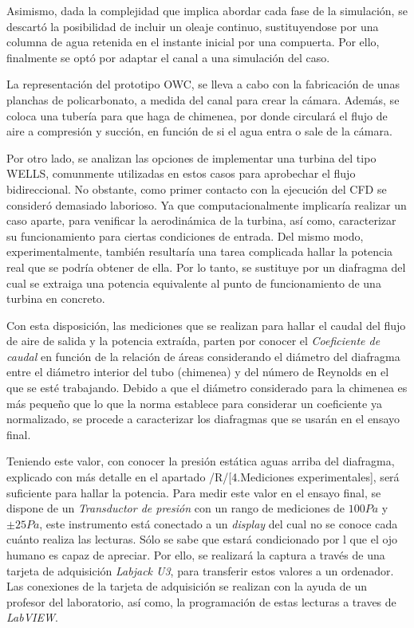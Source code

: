 Asimismo, dada la complejidad que implica abordar cada fase de la
simulación, se descartó la posibilidad de incluir un oleaje continuo,
sustituyendose por una columna de agua retenida en el instante inicial
por una compuerta. Por ello, finalmente se optó por adaptar el canal a
una simulación del caso.

La representación del prototipo OWC, se lleva a cabo con la fabricación
de unas planchas de policarbonato, a medida del canal para crear la
cámara. Además, se coloca una tubería para que haga de chimenea, por
donde circulará el flujo de aire a compresión y succión, en función de
si el agua entra o sale de la cámara.

Por otro lado, se analizan las opciones de implementar una turbina del
tipo WELLS, comunmente utilizadas en estos casos para aprobechar el
flujo bidireccional. No obstante, como primer contacto con la ejecución
del CFD se consideró demasiado laborioso. Ya que computacionalmente
implicaría realizar un caso aparte, para venificar la aerodinámica de la
turbina, así como, caracterizar su funcionamiento para ciertas
condiciones de entrada. Del mismo modo, experimentalmente, también
resultaría una tarea complicada hallar la potencia real que se podría
obtener de ella. Por lo tanto, se sustituye por un diafragma del cual se
extraiga una potencia equivalente al punto de funcionamiento de una
turbina en concreto.

Con esta disposición, las mediciones que se realizan para hallar el
caudal del flujo de aire de salida y la potencia extraída, parten por
conocer el \emph{Coeficiente de caudal} en función de la relación de
áreas considerando el diámetro del diafragma entre el diámetro interior
del tubo (chimenea) y del número de Reynolds en el que se esté
trabajando. Debido a que el diámetro considerado para la chimenea es más
pequeño que lo que la norma establece para considerar un coeficiente ya
normalizado, se procede a caracterizar los diafragmas que se usarán en
el ensayo final.

Teniendo este valor, con conocer la presión estática aguas arriba del
diafragma, explicado con más detalle en el apartado /R/{[}4.Mediciones
experimentales{]}, será suficiente para hallar la potencia. Para medir
este valor en el ensayo final, se dispone de un \emph{Transductor de
presión} con un rango de mediciones de \(100Pa\) y \(\pm 25 Pa\), este
instrumento está conectado a un \emph{display} del cual no se conoce
cada cuánto realiza las lecturas. Sólo se sabe que estará condicionado
por l que el ojo humano es capaz de apreciar. Por ello, se realizará la
captura a través de una tarjeta de adquisición \emph{Labjack U3}, para
transferir estos valores a un ordenador. Las conexiones de la tarjeta de
adquisición se realizan con la ayuda de un profesor del laboratorio, así
como, la programación de estas lecturas a traves de \emph{LabVIEW}.


